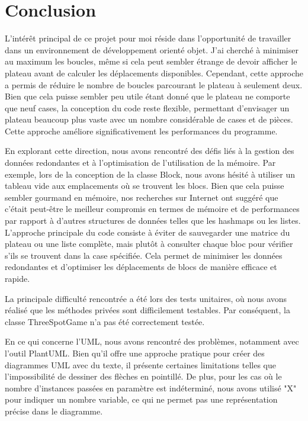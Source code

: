 \documentclass[a4paper,11pt]{article}
\begin{document}
\section{Conclusion}

L'intérêt principal de ce projet pour moi réside dans l'opportunité de travailler dans un environnement de développement orienté objet. J'ai cherché à minimiser au maximum les boucles, même si cela peut sembler étrange de devoir afficher le plateau avant de calculer les déplacements disponibles. Cependant, cette approche a permis de réduire le nombre de boucles parcourant le plateau à seulement deux. Bien que cela puisse sembler peu utile étant donné que le plateau ne comporte que neuf cases, la conception du code reste flexible, permettant d'envisager un plateau beaucoup plus vaste avec un nombre considérable de cases et de pièces. Cette approche améliore significativement les performances du programme.\vspace{10pt} %

En explorant cette direction, nous avons rencontré des défis liés à la gestion des données redondantes et à l'optimisation de l'utilisation de la mémoire. Par exemple, lors de la conception de la classe Block, nous avons hésité à utiliser un tableau vide aux emplacements où se trouvent les blocs. Bien que cela puisse sembler gourmand en mémoire, nos recherches sur Internet ont suggéré que c'était peut-être le meilleur compromis en termes de mémoire et de performances par rapport à d'autres structures de données telles que les hashmaps ou les listes. L'approche principale du code consiste à éviter de sauvegarder une matrice du plateau ou une liste complète, mais plutôt à consulter chaque bloc pour vérifier s'ils se trouvent dans la case spécifiée. Cela permet de minimiser les données redondantes et d'optimiser les déplacements de blocs de manière efficace et rapide.\vspace{10pt} %

La principale difficulté rencontrée a été lors des tests unitaires, où nous avons réalisé que les méthodes privées sont difficilement testables. Par conséquent, la classe ThreeSpotGame n'a pas été correctement testée.\vspace{10pt} %

En ce qui concerne l'UML, nous avons rencontré des problèmes, notamment avec l'outil PlantUML. Bien qu'il offre une approche pratique pour créer des diagrammes UML avec du texte, il présente certaines limitations telles que l'impossibilité de dessiner des flèches en pointillé. De plus, pour les cas où le nombre d'instances passées en paramètre est indéterminé, nous avons utilisé "X" pour indiquer un nombre variable, ce qui ne permet pas une représentation précise dans le diagramme.
\end{document}
